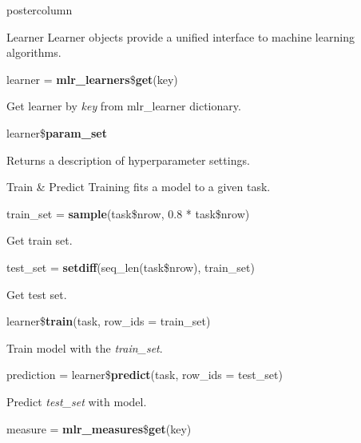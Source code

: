\documentclass{beamer}
\newlength{\columnheight} %
\begin{document}
\begin{frame}[fragile]{}
\begin{columns}
\begin{column}{.245\textwidth}
\begin{beamercolorbox}[center]{postercolumn}
			\begin{minipage}{.98\textwidth}
				\parbox[t][\columnheight]{\textwidth}{
					\begin{myblock}{Learner}
						Learner objects provide a unified interface to machine learning algorithms.
						\\
						\begin{codebox}
							learner = \textbf{mlr\_learners}\$\textbf{get}(key)
						\end{codebox}
						\hspace*{1ex}Get learner by \textit{key} from mlr\_learner dictionary.
						\\
						\begin{codebox}
							learner\$\textbf{param\_set}
						\end{codebox}
						\hspace*{1ex}Returns a description of hyperparameter settings.
					\end{myblock}
				\begin{myblock}{Train \& Predict}
						Training fits a model to a given task. 
						\\
						\begin{codebox}
							train\_set = \textbf{sample}(task\$nrow, 0.8 * task\$nrow)
						\end{codebox}
						\hspace*{1ex}Get train set.
						\\
						\begin{codebox}
							test\_set = \textbf{setdiff}(seq\_len(task\$nrow), train\_set)
						\end{codebox}
						\hspace*{1ex}Get test set.
						\\
						\begin{codebox}
							learner\$\textbf{train}(task, row\_ids = train\_set)
						\end{codebox}
						\hspace*{1ex}Train model with the \textit{train\_set}.
						\\
						\begin{codebox}
							prediction = learner\$\textbf{predict}(task, row\_ids = test\_set)
						\end{codebox}
						\hspace*{1ex}Predict \textit{test\_set} with model.
						\\
						\begin{codebox}
							measure = \textbf{mlr\_measures}\$\textbf{get}(key)
						\end{codebox}

\end{myblock}}
\end{minipage}
\end{beamercolorbox}
\end{column}
\end{columns}
\end{frame}
\end{document}
